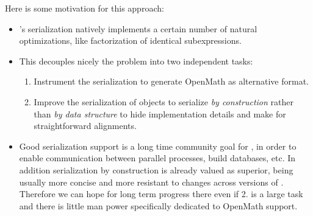 Here is some motivation for this approach:
\begin{itemize}
\item \Python's serialization natively implements a certain number of
  natural optimizations, like factorization of identical subexpressions.


\item This decouples nicely the problem into two independent tasks:
  \begin{enumerate}
  \item Instrument the serialization to generate OpenMath as
    alternative format.
  \item Improve the serialization of \Sage objects to serialize
    \emph{by construction} rather than \emph{by data structure} to
    hide implementation details and make for straightforward
    alignments.
  \end{enumerate}

\item Good serialization support is a long time community goal for
  \Sage, in order to enable communication between parallel processes,
  build databases, etc. In addition serialization by construction is
  already valued as superior, being usually more concise and more
  resistant to changes across versions of \Sage. Therefore we can hope
  for long term progress there even if 2. is a large task and there is
  little man power specifically dedicated to OpenMath support.


\end{itemize}


